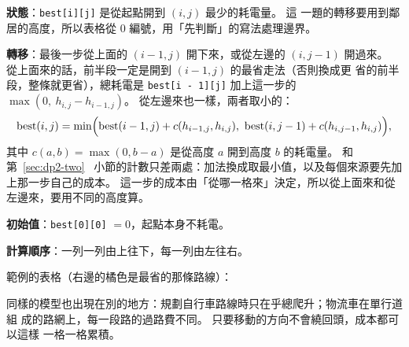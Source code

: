\textbf{狀態}：\texttt{best[i][j]} 是從起點開到 $(i, j)$ 最少的耗電量。 這
一題的轉移要用到鄰居的高度，所以表格從 $0$ 編號，用「先判斷」的寫法處理邊界。

\textbf{轉移}：最後一步從上面的 $(i - 1, j)$ 開下來，或從左邊的 $(i, j - 1)$
開過來。 從上面來的話，前半段一定是開到 $(i - 1, j)$ 的最省走法（否則換成更
省的前半段，整條就更省），總耗電是
\texttt{best[i - 1][j]} 加上這一步的
$\max(0,\ h_{i,j} - h_{i-1,j})$。 從左邊來也一樣，兩者取小的：
\[
\mathrm{best}(i, j) = \min\Bigl(\mathrm{best}(i - 1, j) + c(h_{i-1,j}, h_{i,j}),\
\mathrm{best}(i, j - 1) + c(h_{i,j-1}, h_{i,j})\Bigr),
\]
其中 $c(a, b) = \max(0, b - a)$ 是從高度 $a$ 開到高度 $b$ 的耗電量。 和第~\ref{sec:dp2-two}~
小節的計數只差兩處：加法換成取最小值，以及每個來源要先加上那一步自己的成本。
這一步的成本由「從哪一格來」決定，所以從上面來和從左邊來，要用不同的高度算。

\textbf{初始值}：\texttt{best[0][0]} $= 0$，起點本身不耗電。

\textbf{計算順序}：一列一列由上往下，每一列由左往右。

範例的表格（右邊的橘色是最省的那條路線）：

\begin{center}
\label{fig:dp2-uphill}
\end{center}

同樣的模型也出現在別的地方：規劃自行車路線時只在乎總爬升；物流車在單行道組
成的路網上，每一段路的過路費不同。 只要移動的方向不會繞回頭，成本都可以這樣
一格一格累積。

